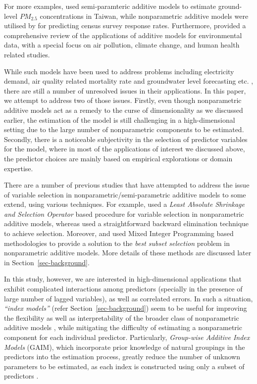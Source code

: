 \documentclass[11pt,a4paper,]{article}
\begin{document}
For more examples, \textcite{Ho2020} used semi-paramteric additive
models to estimate ground-level \(PM_{2.5}\) concentrations in Taiwan,
while nonparametric additive models were utilised by
\textcite{Ibrahim2021} for predicting census survey response rates.
Furthermore, \textcite{Ravindra2019} provided a comprehensive review of
the applications of additive models for environmental data, with a
special focus on air pollution, climate change, and human health related
studies.

While such models have been used to address problems including
electricity demand, air quality related mortality rate and groundwater
level forecasting etc.
\autocite{FH2012,HF2010,Wood2017,Peterson2014,Rajaee2019}, there are
still a number of unresolved issues in their applications. In this
paper, we attempt to address two of those issues. Firstly, even though
nonparametric additive models act as a remedy to the curse of
dimensionality as we discussed earlier, the estimation of the model is
still challenging in a high-dimensional setting due to the large number
of nonparametric components to be estimated. Secondly, there is a
noticeable subjectivity in the selection of predictor variables for the
model, where in most of the applications of interest we discussed above,
the predictor choices are mainly based on empirical explorations or
domain expertise.

There are a number of previous studies that have attempted to address
the issue of variable selection in nonparametric/semi-parametric
additive models to some extend, using various techniques. For example,
\textcite{Huang2010} used a \emph{Least Absolute Shrinkage and Selection
Operator} \autocite[LASSO,][]{Tibshirani1996} based procedure for
variable selection in nonparametric additive models, whereas
\textcite{FH2012} used a straightforward backward elimination technique
to achieve selection. Moreover, \textcite{Ibrahim2021} and
\textcite{Hazimeh2023} used Mixed Integer Programming based
methodologies to provide a solution to the \emph{best subset selection}
problem in nonparametric additive models. More details of these methods
are discussed later in Section~\ref{sec-background}.

In this study, however, we are interested in high-dimensional
applications that exhibit complicated interactions among predictors
(specially in the presence of large number of lagged variables), as well
as correlated errors. In such a situation, \emph{``index models''}
(refer Section~\ref{sec-background}) seem to be useful for improving the
flexibility as well as interpretability of the broader class of
nonparametric additive models \autocite{Radchenko2015}, while mitigating
the difficulty of estimating a nonparametric component for each
individual predictor. Particularly, \emph{Group-wise Additive Index
Models} (GAIM), which incorporate prior knowledge of natural groupings
in the predictors into the estimation process, greatly reduce the number
of unknown parameters to be estimated, as each index is constructed
using only a subset of predictors \autocite{Wang2015-mp,Masselot2022}.
\end{document}
